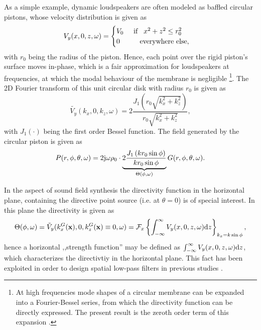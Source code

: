 \vspace{3mm}
As a simple example, dynamic loudspeakers are often modeled as baffled circular pistons, whose velocity distribution is given as
\begin{equation}
V_y(x,0,z,\omega) =
\begin{cases}
V_0  \hspace{5mm} \text{if} \hspace{3mm} x^2+z^2 \leq r_0^2\\ 
0 \hspace{10mm} \text{everywhere else},
\end{cases}
\end{equation} 
with $r_0$ being the radius of the piston.
Hence, each point over the rigid piston's surface moves in-phase, which is a fair approximation for loudspeakers at frequencies, at which the modal behaviour of the membrane is negligible \footnote{At high frequencies mode shapes of a circular membrane can be expanded into a Fourier-Bessel series, from which the directivity function can be directly expressed. 
The present result is the zeroth order term of this expansion \cite{Williams1999}.}.
The 2D Fourier transform of this unit circular disk with radius $r_0$ is given as
\begin{equation}
\tilde{V_y}(k_x,0,k_z,\omega) = 2 \frac{J_1\left( r_0 \sqrt{k_x^2+k_z^2} \right)}{r_0 \sqrt{k_x^2+k_z^2}},
\end{equation}
with $J_1(\cdot)$ being the first order Bessel function. 
The field generated by the circular piston is given as
\begin{equation}
P(r,\phi,\theta,\omega) = 
2 \mathrm{j} \omega \rho_0 \cdot \underbrace{2
\frac{J_1\left( k r_0 \sin \phi \right)}{k r_0 \sin \phi}
}_{\Theta(\phi,\omega)}
G(r,\phi,\theta,\omega).
\label{Eq:App_Circ_piston}
\end{equation}

In the aspect of sound field synthesis the directivity function in the horizontal plane, containing the directive point source (i.e. at $\theta=0$) is of special interest.
In this plane the directivity  is given as
\begin{equation}
\Theta(\phi,\omega) = \tilde{V}_{y}(k_x^G(\mathbf{x}),0,k_z^G(\mathbf{x}) \equiv 0 ,\omega) = \mathcal{F}_x\left\{ \int_{-\infty}^{\infty} V_y(x,0,z,\omega) \mathrm{d} z \right\}_{k_x = k \sin \phi},
\end{equation}
hence a horizontal ,,strength function'' may be defined as $\int_{-\infty}^{\infty} V_y(x,0,z,\omega) \mathrm{d} z$, which characterizes the directivtiy in the horizontal plane.
This fact has been exploited in order to design spatial low-pass filters in previous studies \cite{Verheijen1997}.